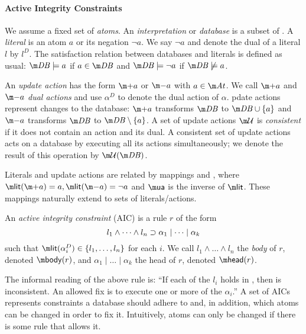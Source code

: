\paragraph{Active Integrity Constraints}
We assume a fixed set \atoms of \emph{atoms}. An \emph{interpretation} or \emph{database} is a subset of \atoms. A \emph{literal} is an atom $a$ or its negation $\lnot a$. 
We say $\lnot a$ and denote the dual of a literal $l$ by $l^D$. 
The satisfaction relation between databases \db and literals is defined as usual: $\db \models a$ if $a\in\db$ and $\db \models \lnot a$ if $\db\not\models a$. 

An \emph{update action} has the form $\add a$ or $\remove a$ with $a\in \atoms$. We call $\add a$ and $\remove a$ \emph{dual actions} and use $\alpha^D$ to denote the dual action of $\alpha$. 
pdate actions represent changes to the database:  $\add a$ transforms $\db$ to $\db\cup\{a\}$ and $\remove a $ transforms $\db$ to $\db\setminus\{a\}$. 
A set of update actions $\UU$ is \emph{consistent} if it does not contain an action and its dual. A consistent set of update actions \UU acts on a database \db by executing all its actions simultaneously; we denote the result of this operation by $\UU(\db)$. 

Literals and update actions are related by mappings \litof and \actof, where $\litof(\add a)= a, \litof(\remove a) = \lnot a$ and $\actof$ is the inverse of $\litof$.
These mappings naturally extend to sets of literals/actions. 

\begin{definition}
 An \emph{active integrity constraint} (AIC) is a rule $r$ of the form
  \begin{equation} l_1\land \dots\land l_n\supset \alpha_1\mid\dots \mid \alpha_k \label{eq:aic}\end{equation}
  such that $\litof(\alpha_i^D) \in \{l_1,\dots,l_n\}$ for each $i$.
%  
  We call $l_1\land \dots \land l_n$ the \emph{body} of $r$, denoted $\body(r)$, and $\alpha_1\mid\dots \mid \alpha_k$ the head of $r$, denoted $\head (r)$.
\end{definition}

The informal reading of the above rule is: ``If each of the $l_i$ holds in \db, then \db is inconsistent. An allowed fix is to execute one or more of the $\alpha_i$.''
A set of AICs represents constraints a database should adhere to and, in addition, which atoms can be changed in order to fix it. Intuitively, atoms can only be changed if there is some rule that allows it. 



